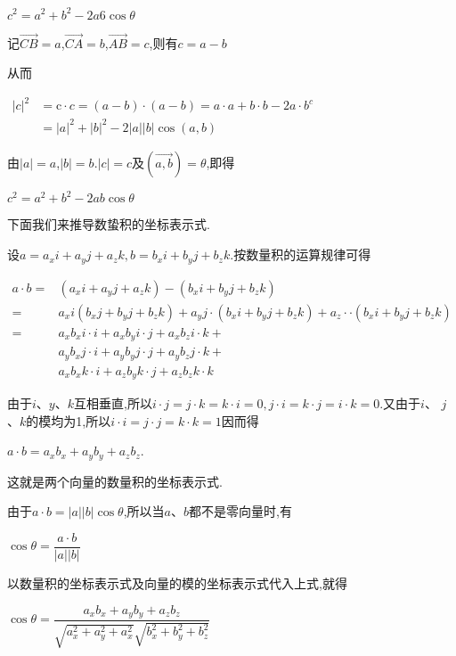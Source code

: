 \documentclass[oneside]{book}
\begin{document}
${c^2} = {a^2} + {b^2} - 2a6{{\cos}}\theta $

记$\overrightarrow {CB}  = a$,$\overrightarrow {CA}  = b$,$\overrightarrow {AB}  = c$,则有$c = a - b$

从而

$\begin{aligned}|c|^{2} &=\mathrm{c} \cdot c=(a-b) \cdot(a-b)=a \cdot a+b \cdot b-2 a \cdot b^{c} \\ &=|a|^{2}+|b|^{2}-2|a||b| \cos (a, b) \end{aligned}$

由$|a| = a$,$|b| = b$.$|c| = c$及$(\overrightarrow {a,b} ) = \theta $,即得

${c^2} = {a^2} + {b^2} - 2ab{{\cos}}\theta $

下面我们来推导数蛰积的坐标表示式.

设$a = {a_x}i + {a_y}j + {a_z}k,b = {b_x}i + {b_y}j + {b_z}k$.按数量积的运算规律可得

$\begin{aligned} a \cdot b=&\left(a_{x} i+a_{y} j+a_{z} k\right)-\left(b_{x} i+b_{y} j+b_{z} k\right) \\=& a_{x} i\left(b_{x} j+b_{y} j+b_{z} k\right)+a_{y} j \cdot\left(b_{x} i+b_{y} j+b_{z} k\right)+a_{z} \cdot \cdot\left(b_{x} i+b_{y} j+b_{z} k\right) \\=& a_{x} b_{x} i \cdot i+a_{x} b_{y} i \cdot j+a_{x} b_{z} i \cdot k+\\ & a_{y} b_{x} j \cdot i+a_{y} b_{y} j \cdot j+a_{y} b_{z} j \cdot k+\\ & a_{x} b_{x} k \cdot i+a_{z} b_{y} k \cdot j+a_{z} b_{z} k \cdot k \end{aligned}$

由于$i$、$y$、$k$互相垂直,所以$i \cdot j = j \cdot k = k \cdot i = 0,j \cdot i = k \cdot j = i \cdot k = 0$.又由于$i$、 $j$、$k$的模均为1,所以$i \cdot i = j \cdot j = k \cdot k = 1$因而得

$a \cdot b = {a_x}{b_x} + {a_y}{b_y} + {a_z}{b_z}$.

这就是两个向量的数量积的坐标表示式.

由于$a \cdot b = |a||b|{{\cos}}\theta $,所以当$a$、$b$都不是零向量时,有

${{\cos}}\theta {{ = }}\dfrac{{a \cdot b}}{{|a||b|}}$

以数量积的坐标表示式及向量的模的坐标表示式代入上式,就得

${{\cos}}\theta {{ = }}\dfrac{{{a_x}{b_x} + {a_y}{b_y} + {a_z}{b_z}}}{{\sqrt {a_x^2 + a_y^2 + a_x^2} \sqrt {b_x^2 + b_y^2 + b_z^2} }}$
\end{document}
